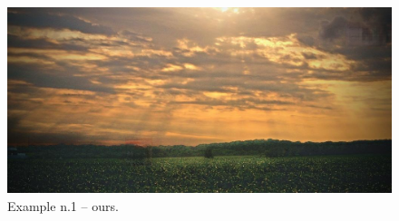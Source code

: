\documentclass[a4paper, 11pt]{article}
\begin{document}
\begin{figure}
    \centering
    \includegraphics[width=.95\linewidth]{documentation/img/modified/0001.png}
    \caption{Example n.1 -- ours.}
    \label{img:ex_n.1_mask}
\end{figure}
\end{document}
